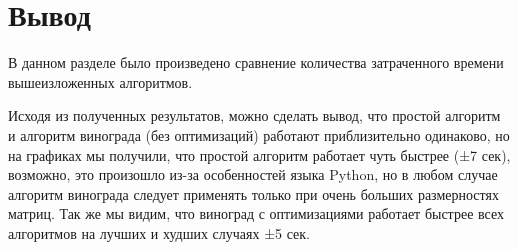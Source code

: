 \section{Вывод}


В данном разделе было произведено сравнение количества затраченного времени вышеизложенных алгоритмов.

Исходя из полученных результатов, можно сделать вывод, что простой алгоритм и алгоритм винограда (без оптимизаций) работают приблизительно одинаково, но на графиках мы получили, что простой алгоритм работает чуть быстрее (±7 сек), возможно, это произошло из-за особенностей языка Python, но в любом случае алгоритм винограда следует применять только при очень больших размерностях матриц. Так же мы видим, что виноград с оптимизациями работает быстрее всех алгоритмов на лучших и худших случаях ±5 сек.
